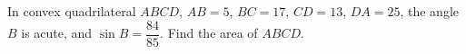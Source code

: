 In convex quadrilateral $ABCD$, $AB=5$, $BC=17$, $CD=13$, $DA=25$, the angle $B$ is acute, and $\sin B=\dfrac{84}{85}$. Find the area of $ABCD$.
